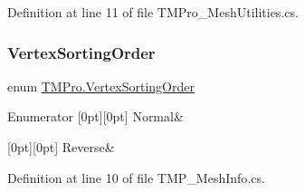 Definition at line 11 of file T\+M\+Pro\+\_\+\+Mesh\+Utilities.\+cs.

\mbox{\label{namespace_t_m_pro_a29c2b2e41c29850d1bc0760ac64b1ee0}} 
\subsubsection{\texorpdfstring{VertexSortingOrder}{VertexSortingOrder}}
{\footnotesize\ttfamily enum \mbox{\hyperlink{namespace_t_m_pro_a29c2b2e41c29850d1bc0760ac64b1ee0}{T\+M\+Pro.\+Vertex\+Sorting\+Order}}\hspace{0.3cm}{\ttfamily [strong]}}

\begin{DoxyEnumFields}{Enumerator}
[0pt][0pt]{}\mbox{\label{namespace_t_m_pro_a29c2b2e41c29850d1bc0760ac64b1ee0a960b44c579bc2f6818d2daaf9e4c16f0}} 
Normal&\\
\hline

[0pt][0pt]{}\mbox{\label{namespace_t_m_pro_a29c2b2e41c29850d1bc0760ac64b1ee0a67f115c1fddc4ce1aeb1c754001585bc}} 
Reverse&\\
\hline

\end{DoxyEnumFields}


Definition at line 10 of file T\+M\+P\+\_\+\+Mesh\+Info.\+cs.

